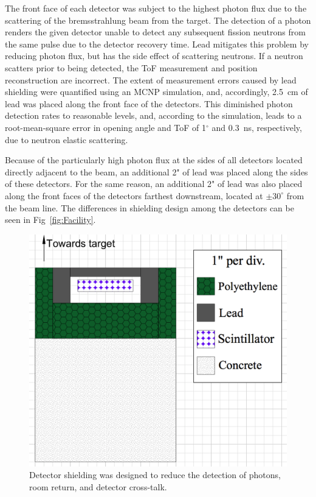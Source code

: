 The front face of each detector was subject to the highest photon flux due to the scattering of the bremsstrahlung beam from the target.
The detection of a photon renders the given detector unable to detect any subsequent fission neutrons from the same pulse due to the detector recovery time.
Lead mitigates this problem by reducing photon flux, but has the side effect of scattering neutrons.
If a neutron scatters prior to being detected, the ToF measurement and position reconstruction are incorrect.
The extent of measurement errors caused by lead shielding were quantified using an MCNP simulation, and, accordingly, 2.5~cm of lead was placed along the front face of the detectors.
This diminished photon detection rates to reasonable levels, and, according to the simulation, leads to a root-mean-square error in opening angle and ToF of 1$^{\circ}$ and 0.3~ns, respectively, due to neutron elastic scattering.

Because of the particularly high photon flux at the sides of all detectors located directly adjacent to the beam, an additional 2" of lead was placed along the sides of these detectors.
For the same reason, an additional 2" of lead was also placed along the front faces of the detectors farthest downstream, located at $\pm30^{\circ}$ from the beam line.
The differences in shielding design among the detectors can be seen in Fig~\ref{fig:Facility}.
\begin{figure}
    \centering
    \includegraphics[width = \FigShieldingSize\textwidth]{DetShielding.png}
    \caption{Detector shielding was designed to reduce the detection of photons, room return, and detector cross-talk.}
    \label{fig:shielding}
\end{figure}

